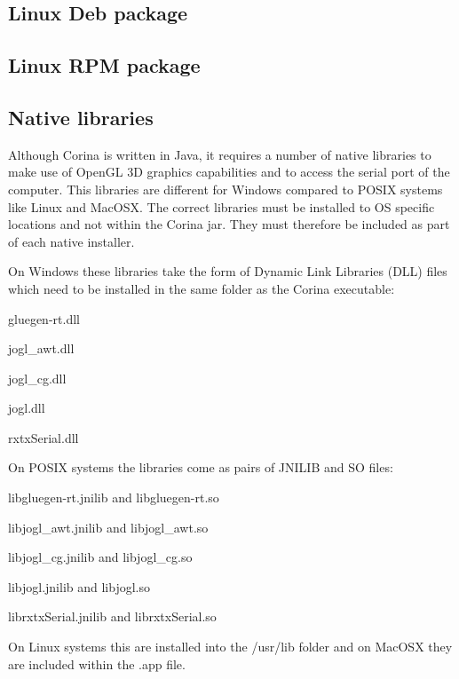 \subsection{Linux Deb package}

\subsection{Linux RPM package}

\subsection{Native libraries}

Although Corina is written in Java, it requires a number of native libraries to make use of OpenGL 3D graphics capabilities and to access the serial port of the computer.  This libraries are different for Windows compared to POSIX systems like Linux and MacOSX.  The correct libraries must be installed to OS specific locations and not within the Corina jar.  They must therefore be included as part of each native installer.

On Windows these libraries take the form of Dynamic Link Libraries (DLL) files which need to be installed in the same folder as the Corina executable:

\begin{itemize*}
 \item gluegen-rt.dll
 \item jogl\_awt.dll
 \item jogl\_cg.dll
 \item jogl.dll
 \item rxtxSerial.dll
\end{itemize*}

On POSIX systems the libraries come as pairs of JNILIB and SO files:

\begin{itemize*}
 \item libgluegen-rt.jnilib and libgluegen-rt.so
 \item libjogl\_awt.jnilib and libjogl\_awt.so
 \item libjogl\_cg.jnilib and libjogl\_cg.so
 \item libjogl.jnilib and libjogl.so
 \item librxtxSerial.jnilib and librxtxSerial.so
\end{itemize*}

On Linux systems this are installed into the /usr/lib folder and on MacOSX they are included within the .app file.

